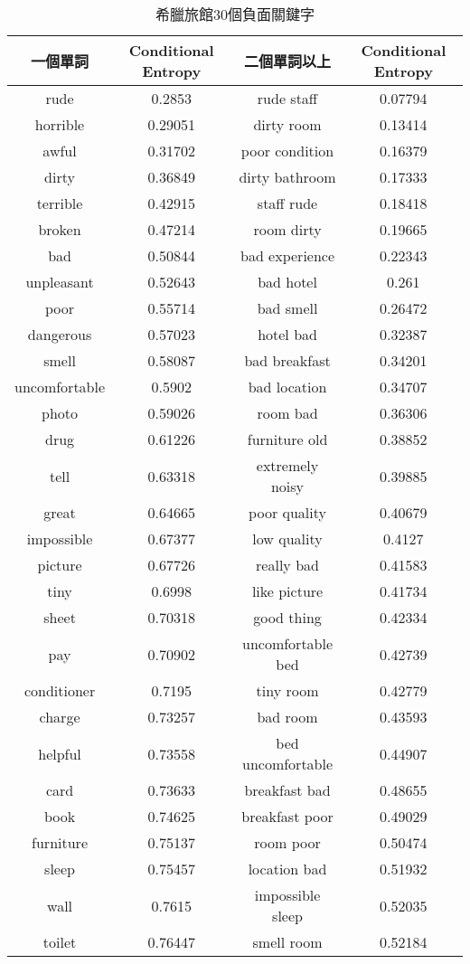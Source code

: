 	\begin{table}[H] 
	\centering
	\caption{希臘旅館30個負面關鍵字}
	\begin{tabular}{|cc||cc|}
	\toprule
	一個單詞 & Conditional Entropy & 二個單詞以上 & Conditional Entropy \\
	\midrule
	rude & 0.2853 & rude staff &  0.07794 \\
	\midrule
	horrible & 0.29051 & dirty room &  0.13414 \\
	\midrule
	awful & 0.31702 & poor condition & 0.16379 \\
	\midrule
	dirty & 0.36849 & dirty bathroom & 0.17333 \\
	\midrule
	terrible & 0.42915 & staff rude & 0.18418 \\
	\midrule
	broken & 0.47214 & room dirty & 0.19665 \\
	\midrule
	bad & 0.50844 & bad experience & 0.22343 \\
	\midrule
	unpleasant & 0.52643 & bad hotel & 0.261 \\
	\midrule
	poor & 0.55714 & bad smell & 0.26472 \\
	\midrule
	dangerous & 0.57023 & hotel bad & 0.32387 \\
	\midrule
	smell & 0.58087 & bad breakfast & 0.34201 \\
	\midrule
	uncomfortable & 0.5902 & bad location & 0.34707 \\
	\midrule
	photo & 0.59026 & room bad & 0.36306 \\
	\midrule
	drug & 0.61226 & furniture old & 0.38852 \\
	\midrule
	tell & 0.63318 & extremely noisy & 0.39885 \\
	\midrule
	great & 0.64665 & poor quality & 0.40679 \\
	\midrule
	impossible & 0.67377 & low quality & 0.4127 \\
	\midrule
	picture & 0.67726 & really bad & 0.41583 \\
	\midrule
	tiny & 0.6998 & like picture & 0.41734 \\
	\midrule
	sheet & 0.70318 & good thing & 0.42334 \\
	\midrule
	pay & 0.70902 & uncomfortable bed & 0.42739 \\
	\midrule
	conditioner & 0.7195 & tiny room & 0.42779 \\
	\midrule
	charge & 0.73257 & bad room & 0.43593 \\
	\midrule
	helpful & 0.73558 & bed uncomfortable & 0.44907 \\
	\midrule
	card & 0.73633 & breakfast bad & 0.48655 \\
	\midrule
	book & 0.74625 & breakfast poor & 0.49029 \\
	\midrule
	furniture & 0.75137 & room poor & 0.50474 \\
	\midrule
	sleep &  0.75457 & location bad & 0.51932 \\
	\midrule
	wall & 0.7615 & impossible sleep & 0.52035 \\
	\midrule
	toilet & 0.76447 & smell room & 0.52184 \\
	\bottomrule
	\end{tabular}
	\label{tab2}   
	\end{table}
	   
